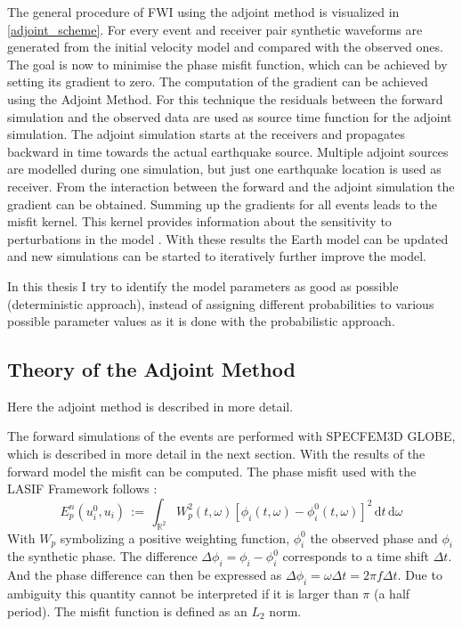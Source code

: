 The general procedure of FWI using the adjoint method is visualized in \autoref{adjoint_scheme}.
For every event and receiver pair synthetic waveforms are generated from the initial velocity model and 
compared with the observed ones.
%
The goal is now to minimise the phase misfit function, which can be achieved by setting its gradient to zero.
The computation of the gradient can be achieved using the Adjoint Method. 
For this technique the residuals between the forward simulation and the observed data are used as source time function 
for the adjoint simulation. 
The adjoint simulation starts at the receivers and propagates backward in time towards the actual earthquake source.
Multiple adjoint sources are modelled during one simulation, but just one earthquake location is used as receiver.
From the interaction between the forward and the adjoint simulation the gradient can be obtained. 
Summing up the gradients for all events leads to the misfit kernel. 
This kernel provides information about the sensitivity to perturbations in the model \citep{Magnoni2012}.
With these results the Earth model can be updated and new simulations can be started to iteratively further improve the model.

In this thesis I try to identify the model parameters as good as possible (deterministic approach), instead of assigning
different probabilities to various possible parameter values as it is done with the probabilistic approach.

\subsection{Theory of the Adjoint Method}

Here the adjoint method is described in more detail.

The forward simulations of the events are performed with SPECFEM3D GLOBE, which is described in more detail in the next section.
%
With the results of the forward model the misfit can be computed.
The phase misfit used with the LASIF Framework follows \citealp{Fichtner2009}:
%
\begin{equation} 
E_p^n(u_i^0, u_i) \, := \, \int_{\mathbb{R}^2} W_p^2(t,\omega) [\phi_i(t,\omega) - \phi_i^0(t,\omega)]^2 
   \, \mathrm{d}t \, \mathrm{d}\omega
\end{equation}
%
With $W_p$ symbolizing a positive weighting function, $\phi_i^0$ the observed phase and $\phi_i$ the synthetic phase.
The difference $\Delta \phi_i = \phi_i - \phi_i^0$ corresponds to a time shift $\Delta t$. 
And the phase difference can then be expressed as $\Delta \phi_i = \omega \Delta t = 2 \pi f \Delta t$.
Due to ambiguity this quantity cannot be interpreted if it is larger than $\pi$ (a half period).
The misfit function is defined as an $L_2$ norm. %

